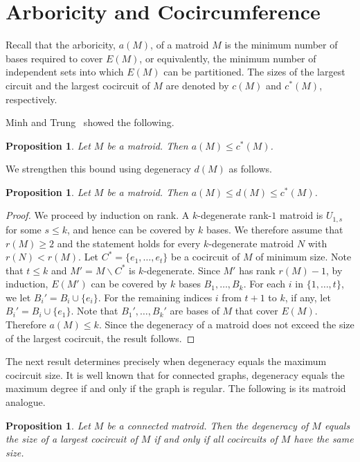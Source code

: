\documentclass{amsart}
\newcommand{\ba}{\backslash}
\newtheorem{proposition}[theorem]{Proposition}
\theoremstyle{definition}
\theoremstyle{remark}
\numberwithin{equation}{section}
\begin{document}
\section{Arboricity and Cocircumference}\label{arboricity}

Recall that the arboricity, $a(M)$, of a matroid $M$ is the minimum number of bases required to cover $E(M)$, or equivalently, the minimum number of independent sets into which $E(M)$ can be partitioned. The sizes of the largest circuit and the largest cocircuit of $M$ are denoted by $c(M)$ and $c^*(M)$, respectively. 

Minh and Trung~\cite[Theorem~3.3]{nguyen} showed the following.

\begin{proposition}
\label{symbolic_result}
Let $M$ be a matroid. Then $a(M) \leq c^*(M)$.
\end{proposition}

We strengthen this bound using degeneracy $d(M)$ as follows. 

\begin{proposition}
\label{prop: arboricity_bound}
Let $M$ be a matroid. Then $a(M) \le d(M) \le c^*(M)$.
\end{proposition}

\begin{proof}
We proceed by induction on rank. A $k$-degenerate rank-$1$ matroid is $U_{1,s}$ for some $s\leq k$, and hence can be covered by $k$ bases. We therefore assume that $r(M)\geq 2$ and the statement holds for every $k$-degenerate matroid $N$ with $r(N)<r(M)$. Let $C^* = \{e_1, \ldots, e_t\}$ be a cocircuit of $M$ of minimum size. Note that $t \leq k$ and $M' = M \ba C^*$ is $k$-degenerate. Since $M'$ has rank $r(M)-1$, by induction, $E(M')$ can be covered by $k$ bases $B_1, \dots, B_k$. For each $i$ in $\{1, \ldots, t\}$, we let $B_i' = B_i \cup \{e_i\}$. For the remaining indices $i$ from $t+1$ to $k$, if any, let $B_i' = B_i \cup \{e_1\}$. Note that $B_1', \ldots, B_k'$ are bases of $M$ that cover $E(M)$. Therefore $a(M) \leq k$. Since the degeneracy of a matroid does not exceed the size of the largest cocircuit, the result follows.
\end{proof}


The next result determines precisely when degeneracy equals the maximum cocircuit size. It is well known that for connected graphs, degeneracy equals the maximum degree if and only if the graph is regular. The following is its matroid analogue.

\begin{proposition}
\label{degeneracy_equals_cogirth}
Let $M$ be a connected matroid. Then the degeneracy of $M$ equals the size of a largest cocircuit of $M$ if and only if all cocircuits of $M$ have the same size.
\end{proposition}
\end{document}
